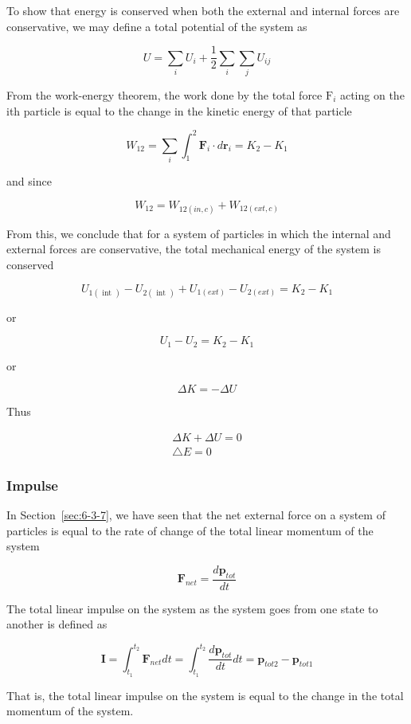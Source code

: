 \documentclass[10pt]{article}
\numberwithin{equation}{section}
\begin{document}
To show that energy is conserved when both the external and internal forces are conservative, we may define a total potential of the system as

$$
U=\sum_{i} U_{i}+\frac{1}{2} \sum_{i} \sum_{j} U_{i j}
$$

From the work-energy theorem, the work done by the total force $\mathrm{F}_{i}$ acting on the ith particle is equal to the change in the kinetic energy of that particle

$$
W_{12}=\sum_{i} \int_{1}^{2} \mathbf{F}_{i} \cdot d \mathbf{r}_{i}=K_{2}-K_{1}
$$

and since

$$
W_{12}=W_{12(i n, c)}+W_{12(e x t, c)}
$$

From this, we conclude that for a system of particles in which the internal and external forces are conservative, the total mechanical energy of the system is conserved

$$
U_{1(\text { int })}-U_{2(\text { int })}+U_{1(e x t)}-U_{2(e x t)}=K_{2}-K_{1}
$$

or

$$
U_{1}-U_{2}=K_{2}-K_{1}
$$

or

$$
\Delta K=-\Delta U
$$

Thus

$$
\begin{gathered}
\Delta K+\Delta U=0 \\
\triangle E=0
\end{gathered}
$$

\subsubsection{Impulse}\label{sec:6-3-17}
In Section~\ref{sec:6-3-7}, we have seen that the net external force on a system of particles is equal to the rate of change of the total linear momentum of the system

$$
\mathbf{F}_{n e t}=\frac{d \mathbf{p}_{t o t}}{d t}
$$

The total linear impulse on the system as the system goes from one state to another is defined as

$$
\mathbf{I}=\int_{t_{1}}^{t_{2}} \mathbf{F}_{n e t} d t=\int_{t_{1}}^{t_{2}} \frac{d \mathbf{p}_{t o t}}{d t} d t=\mathbf{p}_{t o t 2}-\mathbf{p}_{t o t 1}
$$

That is, the total linear impulse on the system is equal to the change in the total momentum of the system.
\end{document}
